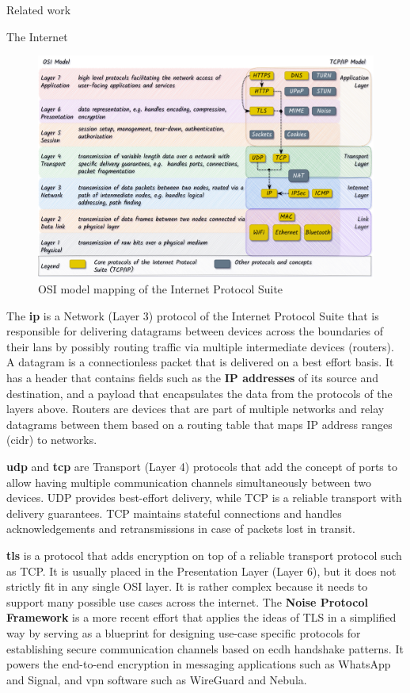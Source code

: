 \begin{frame}[fragile]{Related work}
\begin{block}{The Internet}
\begin{figure}
\centering
\includegraphics[width=\textwidth,height=0.5\textheight]{thesis/../figures/osi-map-tcp.drawio.png}
\caption{OSI model mapping of the Internet Protocol
Suite\label{osi-map-tcp}}
\end{figure}

The \textbf{\acrfull{ip}} is a Network (Layer 3) protocol of the
Internet Protocol Suite that is responsible for delivering datagrams
between devices across the boundaries of their \glspl{lan} by possibly
routing traffic via multiple intermediate devices (routers). A datagram
is a connectionless packet that is delivered on a best effort basis. It
has a header that contains fields such as the \textbf{IP addresses} of
its source and destination, and a payload that encapsulates the data
from the protocols of the layers above. Routers are devices that are
part of multiple networks and relay datagrams between them based on a
routing table that maps IP address ranges (\gls{cidr}) to networks.

\textbf{\acrfull{udp}} and \textbf{\acrfull{tcp}} are Transport (Layer
4) protocols that add the concept of ports to allow having multiple
communication channels simultaneously between two devices. UDP provides
best-effort delivery, while TCP is a reliable transport with delivery
guarantees. TCP maintains stateful connections and handles
acknowledgements and retransmissions in case of packets lost in transit.

\textbf{\acrfull{tls}} is a protocol that adds encryption on top of a
reliable transport protocol such as TCP. It is usually placed in the
Presentation Layer (Layer 6), but it does not strictly fit in any single
OSI layer. It is rather complex because it needs to support many
possible use cases across the internet.  The \textbf{Noise
Protocol Framework} \autocite{noiseDocs} is a more
 recent effort that applies the
ideas of TLS in a simplified way by serving as a blueprint for designing
use-case specific protocols for establishing secure communication
channels based on \gls{ecdh} handshake patterns. It powers the
end-to-end encryption in messaging applications such as WhatsApp and
Signal, and \gls{vpn} software such as WireGuard and Nebula.


\end{block}
\end{frame}
